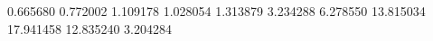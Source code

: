0.665680
0.772002
1.109178
1.028054
1.313879
3.234288
6.278550
13.815034
17.941458
12.835240
3.204284
